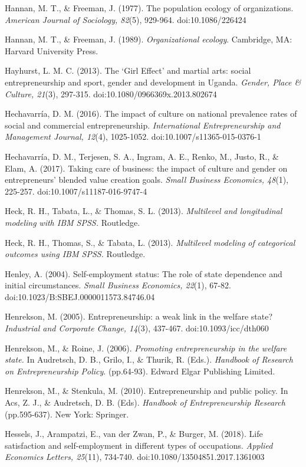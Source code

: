 \documentclass{article}
\begin{document}
Hannan, M. T., \& Freeman, J. (1977). The population ecology of organizations. \emph{American Journal of Sociology, 82}(5), 929-964. doi:10.1086/226424

Hannan, M. T., \& Freeman, J. (1989). \emph{Organizational ecology}. Cambridge, MA: Harvard University Press.

Hayhurst, L. M. C. (2013). The ‘Girl Effect' and martial arts: social entrepreneurship and sport, gender and development in Uganda. \emph{Gender, Place \& Culture, 21}(3), 297-315. doi:10.1080/0966369x.2013.802674

Hechavarría, D. M. (2016). The impact of culture on national prevalence rates of social and commercial entrepreneurship. \emph{International Entrepreneurship and Management Journal, 12}(4), 1025-1052. doi:10.1007/s11365-015-0376-1

Hechavarría, D. M., Terjesen, S. A., Ingram, A. E., Renko, M., Justo, R., \& Elam, A. (2017). Taking care of business: the impact of culture and gender on entrepreneurs' blended value creation goals. \emph{Small Business Economics, 48}(1), 225-257. doi:10.1007/s11187-016-9747-4

Heck, R. H., Tabata, L., \& Thomas, S. L. (2013). \emph{Multilevel and longitudinal }\emph{modeling}\emph{ with IBM SPSS.} Routledge.

Heck, R. H., Thomas, S., \& Tabata, L. (2013). \emph{Multilevel }\emph{modeling}\emph{ of categorical outcomes using IBM SPSS.} Routledge.

Henley, A. (2004). Self-employment status: The role of state dependence and initial circumstances. \emph{Small Business Economics, 22}(1), 67-82. doi:10.1023/B:SBEJ.0000011573.84746.04

Henrekson, M. (2005). Entrepreneurship: a weak link in the welfare state? \emph{Industrial and Corporate Change, 14}(3), 437-467. doi:10.1093/icc/dth060

Henrekson, M., \& Roine, J. (2006). \emph{Promoting entrepreneurship in the welfare state.} In Audretsch, D. B., Grilo, I., \& Thurik, R. (Eds.). \emph{Handbook of Research on Entrepreneurship Policy}. (pp.64-93). Edward Elgar Publishing Limited.

Henrekson, M., \& Stenkula, M. (2010). Entrepreneurship and public policy. In Acs, Z. J., \& Audretsch, D. B. (Eds). \emph{Handbook of Entrepreneurship Research} (pp.595-637). New York: Springer.

Hessels, J., Arampatzi, E., van der Zwan, P., \& Burger, M. (2018). Life satisfaction and self-employment in different types of occupations. \emph{Applied}\emph{ }\emph{Economics}\emph{ Letters, 25}(11), 734-740. doi:10.1080/13504851.2017.1361003
\end{document}
